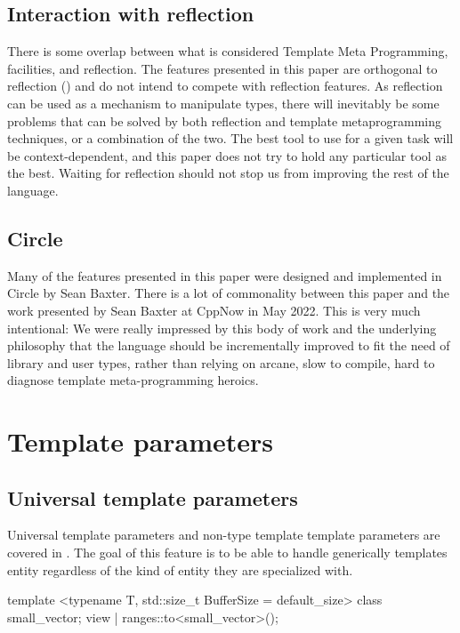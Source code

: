 \documentclass{wg21}
\begin{document}
\subsection{Interaction with reflection}

There is some overlap between what is considered Template Meta Programming,  facilities, and reflection.
The features presented in this paper are orthogonal to reflection () and do not intend to compete with reflection features.
As reflection can be used as a mechanism to manipulate types, there will inevitably be some problems that can be solved by both reflection
and template metaprogramming techniques, or a combination of the two. The best tool to use for a given task will be context-dependent,
and this paper does not try to hold any particular tool as the best.
Waiting for reflection should not stop us from improving the rest of the language.

\subsection{Circle}

Many of the features presented in this paper were designed and implemented in Circle by Sean Baxter.
There is a lot of commonality between this paper and the work presented by Sean Baxter at CppNow in May 2022.
This is very much intentional: We were really impressed by this body of work and the underlying philosophy that the language should be incrementally improved
to fit the need of library and user types, rather than relying on arcane, slow to compile, hard to diagnose template meta-programming heroics.


\section{Template parameters}

\subsection{Universal template parameters}
\label{sec:utp}


Universal template parameters and non-type template template parameters are covered in
.
The goal of this feature is to be able to handle generically templates entity regardless of the kind of entity
they are specialized with.

\begin{colorblock}
template <typename T, std::size_t BufferSize = default_size>
class small_vector;
view | ranges::to<small_vector>();
\end{colorblock}
\end{document}
